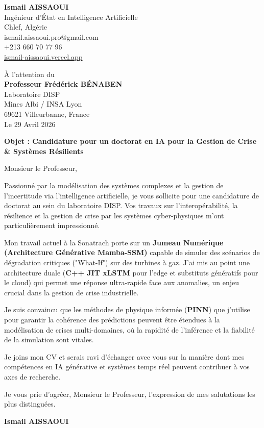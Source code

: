\documentclass[a4paper,12pt]{article}
\begin{document}
\begin{flushleft}
    \textbf{Ismail AISSAOUI} \\
    Ingénieur d'État en Intelligence Artificielle \\
    Chlef, Algérie \\
    ismail.aissaoui.pro@gmail.com \\
    +213 660 70 77 96 \\
    \href{https://ismail-aissaoui.vercel.app}{ismail-aissaoui.vercel.app}
\end{flushleft}

\begin{flushright}
    À l'attention du \\
    \textbf{Professeur Frédérick BÉNABEN} \\
    Laboratoire DISP \\
    Mines Albi / INSA Lyon \\
    69621 Villeurbanne, France \\
    \medskip
    Le 29 Avril 2026
\end{flushright}

\bigskip

\noindent \textbf{Objet : Candidature pour un doctorat en IA pour la Gestion de Crise \& Systèmes Résilients}

\bigskip

Monsieur le Professeur,

Passionné par la modélisation des systèmes complexes et la gestion de l'incertitude via l'intelligence artificielle, je vous sollicite pour une candidature de doctorat au sein du laboratoire DISP. Vos travaux sur l'interopérabilité, la résilience et la gestion de crise par les systèmes cyber-physiques m'ont particulièrement impressionné.

Mon travail actuel à la Sonatrach porte sur un \textbf{Jumeau Numérique (Architecture Générative Mamba-SSM)} capable de simuler des scénarios de dégradation critiques ("What-If") sur des turbines à gaz. J'ai mis au point une architecture duale (\textbf{C++ JIT xLSTM} pour l'edge et substituts génératifs pour le cloud) qui permet une réponse ultra-rapide face aux anomalies, un enjeu crucial dans la gestion de crise industrielle.

Je suis convaincu que les méthodes de physique informée (\textbf{PINN}) que j'utilise pour garantir la cohérence des prédictions peuvent être étendues à la modélisation de crises multi-domaines, où la rapidité de l'inférence et la fiabilité de la simulation sont vitales.

Je joins mon CV et serais ravi d'échanger avec vous sur la manière dont mes compétences en IA générative et systèmes temps réel peuvent contribuer à vos axes de recherche.

Je vous prie d'agréer, Monsieur le Professeur, l'expression de mes salutations les plus distinguées.

\bigskip

\begin{flushright}
    \textbf{Ismail AISSAOUI}
\end{flushright}
\end{document}
